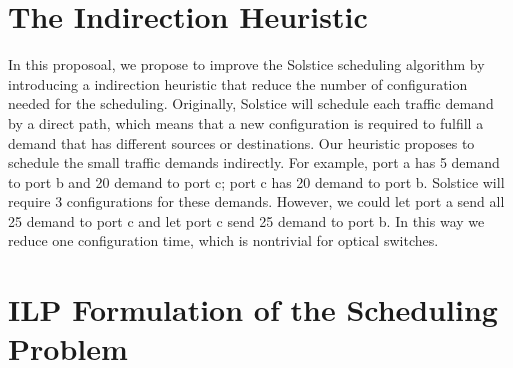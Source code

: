 \section{The Indirection Heuristic}
\label{sec:indirection}
In this proposoal, we propose to improve the Solstice scheduling
algorithm by introducing a indirection heuristic that reduce the number
of configuration needed for the scheduling. Originally, Solstice will
schedule each traffic demand by a direct path, which means that a new
configuration is required to fulfill a demand that has different sources
or destinations. Our heuristic proposes to schedule the small traffic
demands indirectly. For example, port a has 5 demand to port b and 20
demand to port c; port c has 20 demand to port b. Solstice will require
3 configurations for these demands. However, we could let port a send
all 25 demand to port c and let port c send 25 demand to port b. In this
way we reduce one configuration time, which is nontrivial for optical
switches. 

\section{ILP Formulation of the Scheduling Problem}
\label{sec:ilp}
